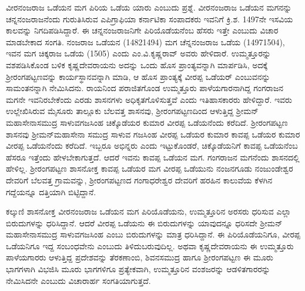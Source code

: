 ವೀರನಂಜರಾಜ ಒಡೆಯನ ಮಗ ಪಿರಿಯ ಒಡೆಯ ಯಾರು ಎಂಬುದು ಪ್ರಶ್ನೆ. ವೀರನಂಜರಾಜ ಒಡೆಯನ ಮಗನನ್ನು ಚನ್ನನಂಜರಾಜನೆಂದು ಗುರುತಿಸಿರುವ ಎಪಿಗ್ರಾಫಿಯಾ ಕರ್ನಾಟಿಕಾ ಸಂಪಾದಕರು ಇವನಿಗೆ ಕ್ರಿ.ಶ. 1497ನೇ ಇಸವಿಯ ಕಾಲವನ್ನು ನಿಗದಿಪಡಿಸಿದ್ದಾರೆ. ಈ ಚನ್ನನಂಜರಾಜನಿಗೇ ಪಿರಿಯೊಡೆಯನೆಂಬ ಹೆಸರು ಇತ್ತೇ ಎಂಬುದು ವಿಚಾರ ಮಾಡಬೇಕಾದ ಸಂಗತಿ. ನಂಜರಾಜ ಒಡೆಯನ (14821494) ಮಗ ಚೆನ್ನನಂಜರಾಜ ಒಡೆಯ (14971504), ಇವನ ಮಗ ಚಿಕ್ಕರಾಜ ಒಡೆಯ (1505) ಎಂದು ಎಂ.ವಿ.ಕೃಷ್ಣರಾವ್​ ಅವರು ಹೇಳಿದಾರೆ. ಉಮ್ಮತ್ತೂರನ್ನು ವಶಪಡಿಸಿಕೊಂಡ ಬಳಿಕ ಕೃಷ್ಣದೇವರಾಯನು ಅದನ್ನು ಒಂದು ಹೊಸ ಪ್ರಾಂತ್ಯವನ್ನಾಗಿ ಮಾರ್ಪಡಿಸಿ, ಅದಕ್ಕೆ ಶ‍್ರೀರಂಗಪಟ್ಟಣವನ್ನು ಕಾರ್ಯಸ್ಥಾನವನ್ನಾಗಿ ಮಾಡಿ, ಆ ಹೊಸ ಪ್ರಾಂತ್ಯಕ್ಕೆ ವೀರಪ್ಪ ಒಡೆಯರ್​ ಎಂಬುವನನ್ನು ಸಾಮಂತನನ್ನಾಗಿ ನೇಮಿಸಿದನು. ರಾಯನಿಂದ ಪರಾಜಿತಗೊಂಡ ಉಮ್ಮತ್ತೂರು ಪಾಳೆಯಗಾರನಾಗಿದ್ದ ಗಂಗರಾಜನ ಮಗನೇ ಇವನಿರಬೇಕೆಂದು ಎರಡು ಶಾಸನಗಳು ಅಧಿಕೃತಗೊಳಿಸುತ್ತವೆ ಎಂದು ಇತಿಹಾಸಕಾರರು ಹೇಳಿದ್ದಾರೆ. ಇವರು ಉಲ್ಲೇಖಿಸಿರುವ ಮೈಸೂರು ತಾಲ್ಲೂಕು ಬೆಲವತ್ತ ಶಾಸನವು, ಶ‍್ರೀರಂಗಪಟ್ಟಣದಿಂದ ಆಳುತ್ತಿದ್ದ ಶ‍್ರೀಮನ್​ ಮಹಾಸೇನಾಸಮುದ್ರ ಸಾಳುವಗಜಸಿಂಹ ಚಿಕ್ಕೊಡೆಯರ ಕುಮಾರ ವೀರಪ್ಪ ಒಡೆಯನೆಂದು ಕರೆದಿದೆ. ಶ‍್ರೀರಂಗಪಟ್ಟಣ ಶಾಸನವು ಶ‍್ರೀಮನ್​ ಮಹಾಸೇನಾ ಸಮುದ್ರ ಸಾಳುವ ಗಜಸಿಂಹ ವೀರಪ್ಪ ಒಡೆಯರ ಕುಮಾರ ಕಾವಪ್ಪ ಒಡೆಯರ ಕುಮಾರ ವೀರಪ್ಪ ಒಡೆಯನೆಂದು ಕರೆದಿದೆ. ಇಬ್ಬರೂ ಅಭಿನ್ನರು ಎಂದು ಇಟ್ಟುಕೊಂಡರೆ, ಚಿಕ್ಕೊಡೆಯನಿಗೆ ಕಾವಪ್ಪ ಒಡೆಯನೆಂಬ ಹೆಸರೂ ಇತ್ತೆಂದು ಹೇಳಬೇಕಾಗುತ್ತದೆ. ಆದರೆ ಇವನು ಕಾವಪ್ಪ ಒಡೆಯನ ಮಗ. ಗಂಗರಾಜನ ಮಗನೆಂದು ಶಾಸನದಲ್ಲಿ ಹೇಳಿಲ್ಲ. ಶ‍್ರೀರಂಗಪಟ್ಟಣ ಶಾಸನೋಕ್ತ ಕಾವಪ್ಪ ಒಡೆಯರ ಮಗ ವೀರಪ್ಪ ಒಡೆಯುನು ನಂಜನಗೂಡು ನಂಜುಂಡೇಶ್ವರ ದೇವರಿಗೆ ಬೆಲವತ್ತ ಗ್ರಾಮವನ್ನು, ಶ‍್ರೀರಂಗಪಟ್ಟಣದ ಗಂಗಾಧರೇಶ್ವರ ದೇವರಿಗೆ ಹರಹಿನ ಕಾಲುವೆಯ ಕೆಳಗಿನ ಗದ್ದೆಯನ್ನೂ ದತ್ತಿಯಾಗಿ ಬಿಟ್ಟಿದ್ದಾನೆ. 

ಕಲ್ಕುಣಿ ಶಾಸನೋಕ್ತ ವೀರನಂಜರಾಜ ಒಡೆಯನ ಮಗ ಪಿರಿಯೊಡೆಯನು, ಉಮ್ಮತ್ತೂರಿನ ಅರಸರು ಧರಿಸುವ ಎಲ್ಲಾ ಬಿರುದುಗಳನ್ನು ಧರಿಸಿದ್ದಾನೆ. ಆದರೆ ವೀರಪ್ಪ ಒಡೆಯನು ಈ ಬಿರುದುಗಳನ್ನು ಯಾವುದನ್ನೂ ಧರಿಸದೇ ಶ‍್ರೀಮನ್​ ಮಹಾಸೇನಾಸಮುದ್ರ ಸಾಳುವಗಜಸಿಂಹ ಎಂಬು ಬಿರುದುಗಳನ್ನು ಮಾತ್ರ ಧರಿಸಿದ್ದಾನೆ. ಈ ಪಿರಿಯೊಡೆಯನಿಗೂ, ವೀರಪ್ಪ ಒಡೆಯನಿಗೂ ಇದ್ದ ಸಂಬಂಧವೇನು ಎಂಬುದು ತಿಳಿದುಬರುವುದಿಲ್ಲ. ಅಥವಾ ಕೃಷ್ಣದೇವರಾಯನು ಈ ಉಮ್ಮತ್ತೂರು ಪಾಳೆಯಗಾರರು ಆಳುತ್ತಿದ್ದ ಪ್ರದೇಶವನ್ನು ತೆರಕಣಾಂಬಿ, ಶಿವನಸಮುದ್ರ ಹಾಗೂ ಶ‍್ರೀರಂಗಪಟ್ಟಣ ಈ ಮೂರು ಭಾಗಗಳಾಗಿ ವಿಭಜಿಸಿ ಮೂರು ಭಾಗಗಳಿಗೂ ಪ್ರತ್ಯೇಕವಾಗಿ, ಉಮ್ಮತ್ತೂರಿನ ವಂಶಜರನ್ನು ಆಡಳಿತಗಾರರನ್ನು ನೇಮಿಸಿದನೇ ಎಂಬುದು ವಿಚಾರಾರ್ಹ ಸಂಗತಿಯಾಗುತ್ತದೆ. 

